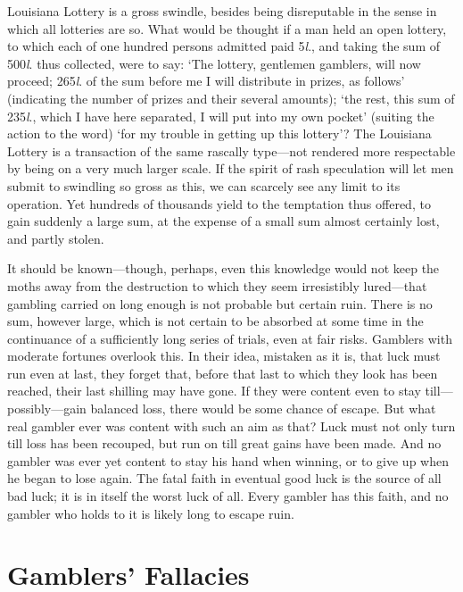 \documentclass[letterpaper,12pt,oneside,openany]{memoir}
\begin{document}
Louisiana Lottery is a gross swindle, besides being disreputable
in the sense in which all lotteries are so.
What would be thought if a man held an open lottery,
to which each of one hundred persons admitted paid
5\textit{l}., and taking the sum of 500\textit{l}. thus collected, were to
say: `The lottery, gentlemen gamblers, will now proceed;
265\textit{l}. of the sum before me I will distribute in
prizes, as follows' (indicating the number of prizes and
their several amounts); `the rest, this sum of 235\textit{l}.,
which I have here separated, I will put into my own
pocket' (suiting the action to the word) `for my trouble
in getting up this lottery'? The Louisiana Lottery is
a transaction of the same rascally type---not rendered
more respectable by being on a very much larger scale.
If the spirit of rash speculation will let men submit
to swindling so gross as this, we can scarcely see any
limit to its operation. Yet hundreds of thousands yield
to the temptation thus offered, to gain suddenly a large
sum, at the expense of a small sum almost certainly lost,
and partly stolen.

It should be known---though, perhaps, even this
knowledge would not keep the moths away from the
destruction to which they seem irresistibly lured---that
gambling carried on long enough is not probable but
certain ruin. There is no sum, however large, which is
not certain to be absorbed at some time in the continuance
of a sufficiently long series of trials, even at fair
risks. Gamblers with moderate fortunes overlook this.
In their idea, mistaken as it is, that luck must run even
at last, they forget that, before that last to which they
look has been reached, their last shilling may have
gone. If they were content even to stay till---possibly---gain
balanced loss, there would be some chance of escape.
But what real gambler ever was content with such an
aim as that? Luck must not only turn till loss has
been recouped, but run on till great gains have been
made. And no gambler was ever yet content to stay
his hand when winning, or to give up when he began
to lose again. The fatal faith in eventual good luck is
the source of all bad luck; it is in itself the worst luck
of all. Every gambler has this faith, and no gambler
who holds to it is likely long to escape ruin.

\chapter{Gamblers' Fallacies}
\end{document}
